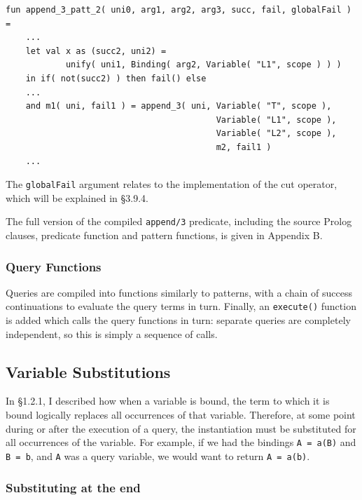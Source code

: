 \documentclass[12pt]{article}
\begin{document}
\begin{verbatim}
fun append_3_patt_2( uni0, arg1, arg2, arg3, succ, fail, globalFail ) = 
    ...
    let val x as (succ2, uni2) = 
            unify( uni1, Binding( arg2, Variable( "L1", scope ) ) )
    in if( not(succ2) ) then fail() else
    ...
    and m1( uni, fail1 ) = append_3( uni, Variable( "T", scope ), 
                                          Variable( "L1", scope ), 
                                          Variable( "L2", scope ), 
                                          m2, fail1 )
    ...
\end{verbatim}

The \verb|globalFail| argument relates to the implementation of the cut operator, which will be explained in \S3.9.4.

The full version of the compiled \verb|append/3| predicate, including the source Prolog clauses, predicate function and pattern functions, is given in Appendix B.


\subsubsection{Query Functions}

Queries are compiled into functions similarly to patterns, with a chain of success continuations to evaluate the query terms in turn. 
Finally, an \verb|execute()| function is added which calls the query functions in turn: separate queries are completely independent, so this is simply a sequence of calls.

\subsection{Variable Substitutions}

In \S1.2.1, I described how when a variable is bound, the term to which it is bound logically replaces all occurrences of that variable. 
Therefore, at some point during or after the execution of a query, the instantiation must be substituted for all occurrences of the variable. 
For example, if we had the bindings \verb|A = a(B)| and \verb|B = b|, and \verb|A| was a query variable, we would want to return \verb|A = a(b)|.

\subsubsection{Substituting at the end}
\end{document}
